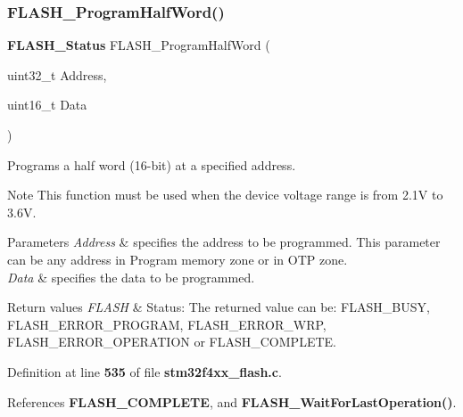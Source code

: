 \subsubsection{F\+L\+A\+S\+H\+\_\+\+Program\+Half\+Word()}
{\footnotesize\ttfamily \textbf{ F\+L\+A\+S\+H\+\_\+\+Status} F\+L\+A\+S\+H\+\_\+\+Program\+Half\+Word (\begin{DoxyParamCaption}\item[{uint32\+\_\+t}]{Address,  }\item[{uint16\+\_\+t}]{Data }\end{DoxyParamCaption})}



Programs a half word (16-\/bit) at a specified address. 

\begin{DoxyNote}{Note}
This function must be used when the device voltage range is from 2.\+1V to 3.\+6V. 
\end{DoxyNote}

\begin{DoxyParams}{Parameters}
{\em Address} & specifies the address to be programmed. This parameter can be any address in Program memory zone or in O\+TP zone. \\
\hline
{\em Data} & specifies the data to be programmed. \\
\hline
\end{DoxyParams}

\begin{DoxyRetVals}{Return values}
{\em F\+L\+A\+SH} & Status\+: The returned value can be\+: F\+L\+A\+S\+H\+\_\+\+B\+U\+SY, F\+L\+A\+S\+H\+\_\+\+E\+R\+R\+O\+R\+\_\+\+P\+R\+O\+G\+R\+AM, F\+L\+A\+S\+H\+\_\+\+E\+R\+R\+O\+R\+\_\+\+W\+RP, F\+L\+A\+S\+H\+\_\+\+E\+R\+R\+O\+R\+\_\+\+O\+P\+E\+R\+A\+T\+I\+ON or F\+L\+A\+S\+H\+\_\+\+C\+O\+M\+P\+L\+E\+TE. \\
\hline
\end{DoxyRetVals}


Definition at line \textbf{ 535} of file \textbf{ stm32f4xx\+\_\+flash.\+c}.



References \textbf{ F\+L\+A\+S\+H\+\_\+\+C\+O\+M\+P\+L\+E\+TE}, and \textbf{ F\+L\+A\+S\+H\+\_\+\+Wait\+For\+Last\+Operation()}.


